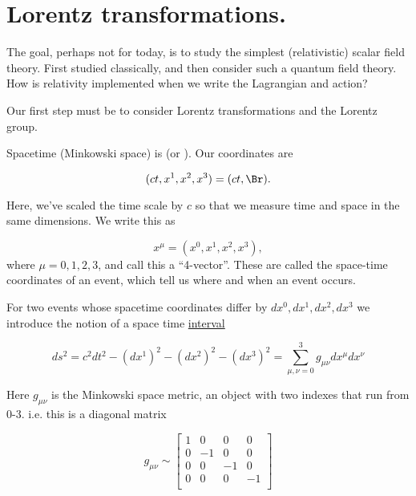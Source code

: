 %
%
\section{Lorentz transformations.}

The goal, perhaps not for today, is to study the simplest (relativistic) scalar field theory.  First studied classically, and then consider such a quantum field theory.
How is relativity implemented when we write the Lagrangian and action?

Our first step must be to consider Lorentz transformations and the Lorentz group.

Spacetime (Minkowski space) is  (or ).  Our coordinates are

\begin{dmath}\label{eqn:qftLecture2:340}
(c t, x^1, x^2, x^3) = (c t, \Br).
\end{dmath}

Here, we've scaled the time scale by \( c \) so that we measure time and space in the same dimensions.  We write this as

\begin{dmath}\label{eqn:qftLecture2:360}
x^\mu = (x^0, x^1, x^2, x^3),
\end{dmath}
%
where \( \mu = 0, 1, 2, 3 \), and call this a ``4-vector''.  These are called the space-time coordinates of an event, which tell us where and when an event occurs.

For two events whose spacetime coordinates differ by \( dx^0, dx^1, dx^2, dx^3 \) we introduce the notion of a space time \underline{interval}

\begin{dmath}\label{eqn:qftLecture2:380}
ds^2 = c^2 dt^2
- (dx^1)^2
- (dx^2)^2
- (dx^3)^2
=
\sum_{\mu, \nu = 0}^3 g_{\mu\nu} dx^\mu dx^\nu
\end{dmath}

Here \( g_{\mu\nu} \) is the Minkowski space metric, an object with two indexes that run from 0-3.  i.e. this is a diagonal matrix

\begin{dmath}\label{eqn:qftLecture2:400}
g_{\mu\nu} \sim
\begin{bmatrix}
1 & 0 & 0 & 0 \\
0 & -1 & 0 & 0 \\
0 & 0 & -1 & 0 \\
0 & 0 & 0 & -1 \\
\end{bmatrix}
\end{dmath}

